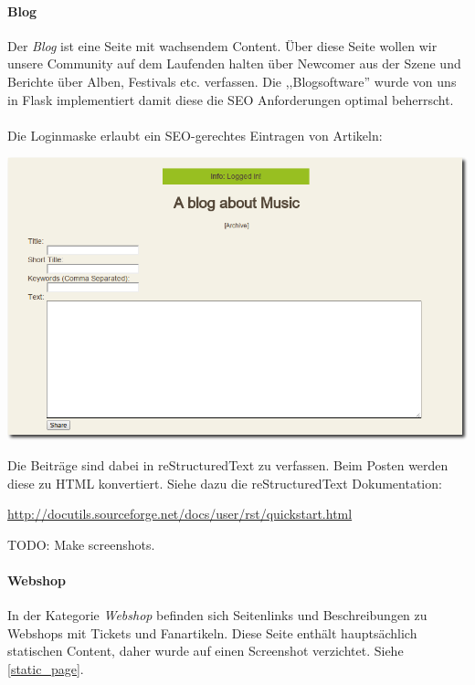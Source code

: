 \paragraph{Blog}
Der \emph{Blog} ist eine Seite mit wachsendem Content. Über diese Seite wollen
wir unsere Community auf dem Laufenden halten über Newcomer aus der Szene und
Berichte über Alben, Festivals etc. verfassen. Die ,,Blogsoftware'' wurde von
uns in Flask implementiert damit diese die SEO Anforderungen optimal beherrscht.
\\
\\
Die Loginmaske erlaubt ein SEO-gerechtes Eintragen von Artikeln:
\begin{center}
\includegraphics[scale=0.5]{../screenshots/post_entry.png}
\end{center}

Die Beiträge sind dabei in reStructuredText zu verfassen. Beim Posten werden
diese zu HTML konvertiert. Siehe dazu die reStructuredText Dokumentation:

\begin{center}
\url{http://docutils.sourceforge.net/docs/user/rst/quickstart.html}
\end{center}

TODO: Make screenshots.

\paragraph{Webshop}
In der Kategorie \emph{Webshop} befinden sich Seitenlinks und Beschreibungen zu
Webshops mit Tickets und Fanartikeln. Diese Seite enthält hauptsächlich
statischen Content, daher wurde auf einen Screenshot verzichtet. Siehe
\ref{static_page}.

